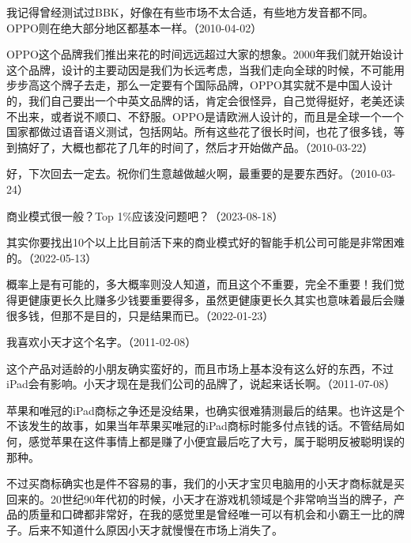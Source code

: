我记得曾经测试过BBK，好像在有些市场不太合适，有些地方发音都不同。OPPO则在绝大部分地区都基本一样。（2010-04-02）


OPPO这个品牌我们推出来花的时间远远超过大家的想象。2000年我们就开始设计这个品牌，设计的主要动因是我们为长远考虑，当我们走向全球的时候，不可能用步步高这个牌子去走，那么一定要有个国际品牌，OPPO其实就不是中国人设计的，我们自己要出一个中英文品牌的话，肯定会很怪异，自己觉得挺好，老美还读不出来，或者说不顺口、不舒服。OPPO是请欧洲人设计的，而且是全球一个一个国家都做过语音语义测试，包括网站。所有这些花了很长时间，也花了很多钱，等到搞好了，大概也都花了几年的时间了，然后才开始做产品。（2010-03-22）


好，下次回去一定去。祝你们生意越做越火啊，最重要的是要东西好。（2010-03-24）


商业模式很一般？Top 1\%应该没问题吧？（2023-08-18）

其实你要找出10个以上比目前活下来的商业模式好的智能手机公司可能是非常困难的。（2022-05-13）


概率上是有可能的，多大概率则没人知道，而且这个不重要，完全不重要！我们觉得更健康更长久比赚多少钱要重要得多，虽然更健康更长久其实也意味着最后会赚很多钱，但那不是目的，只是结果而已。（2022-01-23）

我喜欢小天才这个名字。（2011-02-08）

这个产品对适龄的小朋友确实蛮好的，而且市场上基本没有这么好的东西，不过iPad会有影响。小天才现在是我们公司的品牌了，说起来话长啊。（2011-07-08）

苹果和唯冠的iPad商标之争还是没结果，也确实很难猜测最后的结果。也许这是个不该发生的故事，如果当年苹果买唯冠的iPad商标时能多付点钱的话。不管结局如何，感觉苹果在这件事情上都是赚了小便宜最后吃了大亏，属于聪明反被聪明误的那种。

不过买商标确实也是件不容易的事，我们的小天才宝贝电脑用的小天才商标就是买回来的。20世纪90年代初的时候，小天才在游戏机领域是个非常响当当的牌子，产品的质量和口碑都非常好，在我的感觉里是曾经唯一可以有机会和小霸王一比的牌子。后来不知道什么原因小天才就慢慢在市场上消失了。

